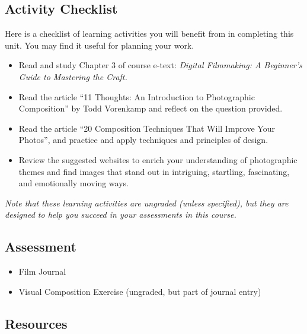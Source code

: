 \documentclass[
]{book}
\providecommand{\tightlist}{%
  \setlength{\itemsep}{0pt}\setlength{\parskip}{0pt}}
\begin{document}
\hypertarget{activity-checklist-2}{%
\subsection*{Activity Checklist}\label{activity-checklist-2}}

\begin{reflect}
Here is a checklist of learning activities you will benefit from in completing this unit. You may find it useful for planning your work.

\begin{itemize}
\tightlist
\item
  Read and study Chapter 3 of course e-text: \emph{Digital Filmmaking: A Beginner's Guide to Mastering the Craft.}
\item
  Read the article ``11 Thoughts: An Introduction to Photographic Composition'' by Todd Vorenkamp and reflect on the question provided.
\item
  Read the article ``20 Composition Techniques That Will Improve Your Photos'', and practice and apply techniques and principles of design.
\item
  Review the suggested websites to enrich your understanding of photographic themes and find images that stand out in intriguing, startling, fascinating, and emotionally moving ways.
\end{itemize}

\emph{Note that these learning activities are ungraded (unless specified), but they are designed to help you succeed in your assessments in this course.}
\end{reflect}

\hypertarget{assessment-4}{%
\subsection*{Assessment}\label{assessment-4}}

\begin{itemize}
\tightlist
\item
  Film Journal\\
\item
  Visual Composition Exercise (ungraded, but part of journal entry)
\end{itemize}

\hypertarget{resources-2}{%
\subsection*{Resources}\label{resources-2}}
\end{document}
